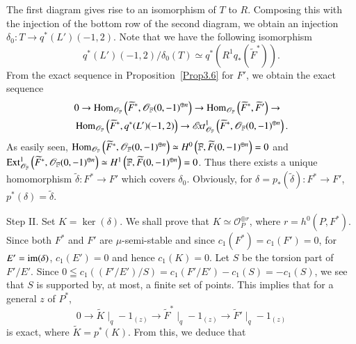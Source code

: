 \begin{Proof}
$$$$
The first diagram gives rise to an isomorphism of $T$ to
$R$. Composing this with the injection of the bottom row of the second
diagram, we obtain an injection $\delta_{0}:T\to
q^{\ast}(L')(-1,2)$. Note that we have the following isomorphism 
\begin{equation}\label{eqn4.8.4}
q^{\ast}(L')(-1,2)/\delta_0(T)\simeq q^{\ast}\left(R^{1}q_{\ast}\left(\widetilde{F}^{\ast}\right)\right).
\end{equation}
\pageoriginale
From the exact sequence in Proposition~\ref{Prop3.6} for $F'$, we
obtain the exact sequence 
\begin{align*}
&0\to
\operatorname{Hom}_{\mathscr{O}_{\mathbb{F}}}\left(\widetilde{F}^{\ast},\mathscr{O}_{\mathbb{F}}(0,-1)^{\oplus n}\right)\to
\operatorname{Hom}_{\mathscr{O}_{\mathbb{F}}}\left(\widetilde{F}^{\ast},\widetilde{F}'\right)\to\\
& \operatorname{Hom}_{\mathscr{O}_{\mathbb{F}}}\left(\widetilde{F}^{\ast},q^{\ast}(L')(-1,2)\right)\to
\mathscr{E}\!{\it xt}^{1}_{\mathscr{O}_{\mathbb{F}}}\left(\widetilde{F}^{\ast},\mathscr{O}_{\mathbb{F}}(0,-1)^{\oplus n}\right). 
\end{align*}
As easily seen,
$\operatorname{Hom}_{\mathscr{O}_{\mathbb{F}}}\left(\widetilde{F}^{\ast},\mathscr{O}_{\mathbb{F}}(0,-1)^{\oplus
  n}\right)\simeq H^{0}\left(\mathbb{F},\widetilde{F}(0,-1)^{\oplus n}\right)=0$
and
$\operatorname{Ext}^{1}_{\mathscr{O}_{\mathbb{F}}}\left(\widetilde{F}^{\ast},\mathscr{O}_{\mathbb{F}}(0,-1)^{\oplus
  n}\right)\simeq H^{1}\left(\mathbb{F},\widetilde{F}(0,-1)^{\oplus
  n}\right)=0$. Thus there exists a unique homomorphism
$\widetilde{\delta}:F^{\ast}\to F'$ which covers
$\delta_{0}$. Obviously, for
$\delta=p_{\ast}\left(\widetilde{\delta}\right):F^{\ast}\to F'$,
$p^{\ast}(\delta)=\widetilde{\delta}$. 

Step II. Set $K=\ker(\delta)$. We shall prove that $K\simeq
\mathscr{O}_{P}^{\oplus r}$, where $r=h^{0}(P,F^{\ast})$. Since both
$F^{\ast}$ and $F'$ are $\mu$-semi-stable and since
$c_1(F^{\ast})=c_1(F')=0$, for $E'=\mathrm{im}(\delta)$, $c_1(E')=0$ and hence
$c_1(K)=0$. Let $S$ be the torsion part of $F'/E'$. Since
$0\leqq
c_1((F'/E')/S)=c_1(F'/E')-c_1(S)=-c_1(S)$,
we see that $S$ is supported by, at most, a finite set of points. This
implies that for a general $z$ of $P^{\ast}$,
$$
0\to \widetilde{K}\mid_q-1_{(z)}\to
\widetilde{F}^{\ast}\mid_q-1_{(z)}\to \widetilde{F}'\mid_q-1_{(z)}
$$
is exact, where $\widetilde{K}=p^{\ast}(K)$. From this, we deduce that 

\setcounter{subsection}{8}
\setcounter{subsubsection}{4}

\end{Proof}
